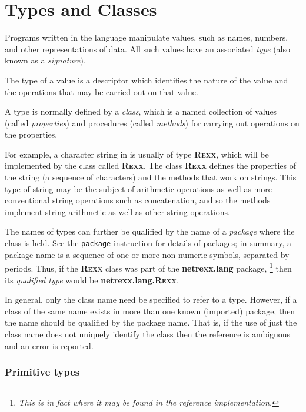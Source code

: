\chapter{Types and Classes}\label{reftypes}
\index{,}
 
Programs written in the \nr{} language manipulate values, such as
names, numbers, and other representations of data.
All such values have an associated \emph{type} (also known as a
\emph{signature}).
 
The type of a value is a descriptor which identifies the nature of the
value and the operations that may be carried out on that value.
 
A type is normally defined by a \emph{class}, which is a named
collection of values (called \emph{properties}) and procedures (called
\emph{methods}) for carrying out operations on the properties.
 
For example, a character string in \nr{} is usually of
type \textbf{R\textsc{exx}}, which will be implemented by the class
called \textbf{R\textsc{exx}}.
The class \textbf{R\textsc{exx}} defines the properties of the string (a
sequence of characters) and the methods that work on strings.
This type of string may be the subject of arithmetic operations as well
as more conventional string operations such as concatenation, and so the
methods implement string arithmetic as well as other string operations.
 
The names of types can further be qualified by the name of a
\emph{package} where the class is held.  See the \texttt{package}
instruction for details of packages; in summary, a package name is a
sequence of one or more non-numeric symbols, separated by periods.
Thus, if the \textbf{R\textsc{exx}} class was part of
the \textbf{netrexx.lang} package,
\footnote{
\emph{This is in fact where it may be found in the reference
implementation.}
}
then its \emph{qualified type} would be \textbf{netrexx.lang.R\textsc{exx}}.
 
In general, only the class name need be specified to refer to a type.
However, if a class of the same name exists in more than one known
(imported) package, then the name should be qualified by the package
name.  That is, if the use of just the class name does not uniquely
identify the class then the reference is ambiguous and an error is
reported.
\subsection{Primitive types}\label{refprims}
 
